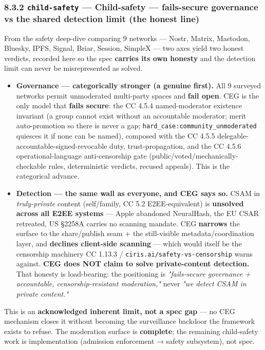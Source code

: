 \documentclass[11pt]{article}
\begin{document}
{\begin{longtable}{|p{8.0cm}|p{8.0cm}|}
\end{longtable}}


\subsubsection*{8.3.2 \texttt{child-safety} — Child-safety — fails-secure governance vs the shared detection limit (the honest line)}


From the safety deep-dive comparing 9 networks — Nostr, Matrix, Mastodon, Bluesky, IPFS, Signal, Briar, Session, SimpleX — two axes yield two honest verdicts, recorded here so the spec \textbf{carries its own honesty} and the detection limit can never be misrepresented as solved.


\begin{itemize}\setlength\itemsep{0pt}
\item \textbf{Governance — categorically stronger (a genuine first).} All 9 surveyed networks permit unmoderated multi-party spaces and \textbf{fail open}. CEG is the only model that \textbf{fails secure}: the CC 4.5.4 named-moderator existence invariant (a group cannot exist without an accountable moderator; merit auto-promotion so there is never a gap; \texttt{hard\_case:community\_unmoderated} quiesces it if none can be named), composed with the CC 4.5.5 delegable-accountable-signed-revocable duty, trust-propagation, and the CC 4.5.6 operational-language anti-censorship gate (public/voted/mechanically-checkable rules, deterministic verdicts, recused appeals). This is the categorical advance.
\item \textbf{Detection — the same wall as everyone, and CEG says so.} CSAM in \textit{truly-private} content (self/family, CC 5.2 E2EE-equivalent) is \textbf{unsolved across all E2EE systems} — Apple abandoned NeuralHash, the EU CSAR retreated, US §2258A carries no scanning mandate. CEG \textbf{narrows} the surface to the share/publish seam + the still-visible metadata/coordination layer, and \textbf{declines client-side scanning} — which would itself be the censorship machinery CC 1.13.3 / \texttt{ciris.ai/safety-vs-censorship} warns against. \textbf{CEG does NOT claim to solve private-content detection.} That honesty is load-bearing: the positioning is \textit{"fails-secure governance + accountable, censorship-resistant moderation,"} never \textit{"we detect CSAM in private content."}
\end{itemize}


This is an \textbf{acknowledged inherent limit, not a spec gap} — no CEG mechanism closes it without becoming the surveillance backdoor the framework exists to refuse. The moderation surface is \textbf{complete}; the remaining child-safety work is implementation (admission enforcement → safety subsystem), not spec.
\end{document}
